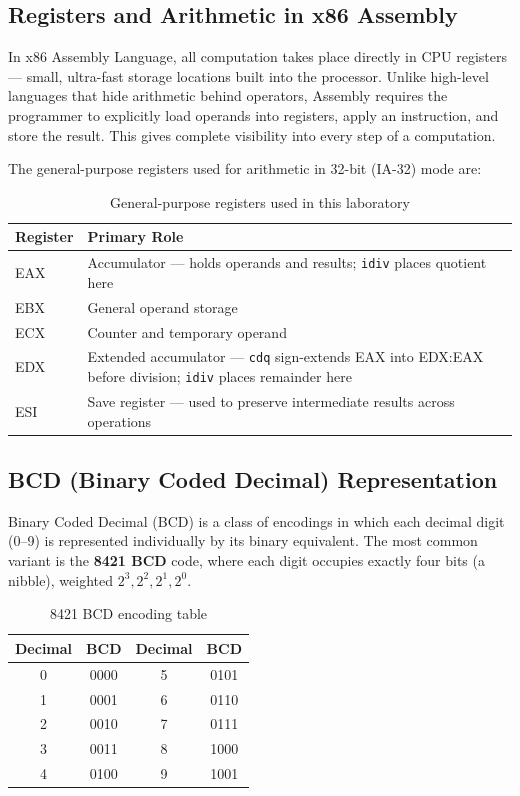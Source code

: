 \documentclass[12pt,a4paper]{article}
\begin{document}
\subsection{Registers and Arithmetic in x86 Assembly}

In x86 Assembly Language, all computation takes place directly in CPU registers --- small,
ultra-fast storage locations built into the processor. Unlike high-level languages that
hide arithmetic behind operators, Assembly requires the programmer to explicitly load
operands into registers, apply an instruction, and store the result. This gives complete
visibility into every step of a computation.

The general-purpose registers used for arithmetic in 32-bit (IA-32) mode are:

\begin{table}[H]
\centering
\caption{General-purpose registers used in this laboratory}
\small
\begin{tabular}{|l|p{10cm}|}
\hline
\textbf{Register} & \textbf{Primary Role} \\
\hline
EAX & Accumulator --- holds operands and results; \texttt{idiv} places quotient here \\
\hline
EBX & General operand storage \\
\hline
ECX & Counter and temporary operand \\
\hline
EDX & Extended accumulator --- \texttt{cdq} sign-extends EAX into EDX:EAX before division;
\texttt{idiv} places remainder here \\
\hline
ESI & Save register --- used to preserve intermediate results across operations \\
\hline
\end{tabular}
\end{table}

\subsection{BCD (Binary Coded Decimal) Representation}

Binary Coded Decimal (BCD) is a class of encodings in which each decimal digit (0--9) is
represented individually by its binary equivalent. The most common variant is the
\textbf{8421 BCD} code, where each digit occupies exactly four bits (a nibble), weighted
$2^3, 2^2, 2^1, 2^0$.

\begin{table}[H]
\centering
\caption{8421 BCD encoding table}
\small
\begin{tabular}{|c|c||c|c|}
\hline
\textbf{Decimal} & \textbf{BCD} & \textbf{Decimal} & \textbf{BCD} \\
\hline
0 & 0000 & 5 & 0101 \\
\hline
1 & 0001 & 6 & 0110 \\
\hline
2 & 0010 & 7 & 0111 \\
\hline
3 & 0011 & 8 & 1000 \\
\hline
4 & 0100 & 9 & 1001 \\
\hline
\end{tabular}
\end{table}
\end{document}

